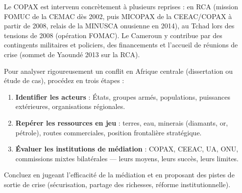 \documentclass[11pt]{article}
\newcommand{\cle}[1]{{\popxbold\color{popdark}#1}}
\begin{document}
Le COPAX est intervenu concrètement à plusieurs reprises : en \cle{RCA} (mission \cle{FOMUC} de la CEMAC dès 2002, puis \cle{MICOPAX} de la CEEAC/COPAX à partir de 2008, relais de la \cle{MINUSCA} onusienne en 2014), au \cle{Tchad} lors des tensions de 2008 (opération FOMAC). Le Cameroun y contribue par des contingents militaires et policiers, des financements et l'accueil de réunions de crise (sommet de Yaoundé 2013 sur la RCA).

\begin{methode}
Pour analyser rigoureusement un conflit en Afrique centrale (dissertation ou étude de cas), procédez en trois étapes :
\begin{enumerate}
\item \textbf{Identifier les acteurs} : États, groupes armés, populations, puissances extérieures, organisations régionales.
\item \textbf{Repérer les ressources en jeu} : terres, eau, minerais (diamants, or, pétrole), routes commerciales, position frontalière stratégique.
\item \textbf{Évaluer les institutions de médiation} : COPAX, CEEAC, UA, ONU, commissions mixtes bilatérales — leurs moyens, leurs succès, leurs limites.
\end{enumerate}
Concluez en jugeant l'efficacité de la médiation et en proposant des pistes de sortie de crise (sécurisation, partage des richesses, réforme institutionnelle).
\end{methode}
\end{document}
